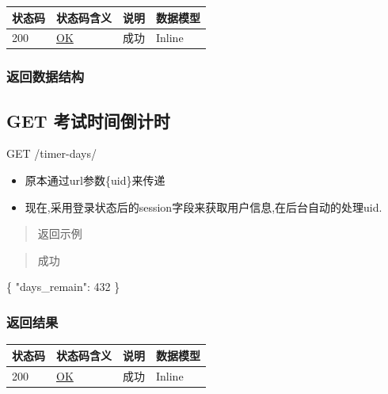 \documentclass[
]{article}
\newenvironment{Shaded}{}{}
\newcommand{\DataTypeTok}[1]{\textcolor[rgb]{0.56,0.13,0.00}{#1}}
\newcommand{\DecValTok}[1]{\textcolor[rgb]{0.25,0.63,0.44}{#1}}
\newcommand{\FunctionTok}[1]{\textcolor[rgb]{0.02,0.16,0.49}{#1}}
\begin{document}
\begin{longtable}[]{@{}llll@{}}
\toprule
状态码 & 状态码含义 & 说明 & 数据模型 \\
\midrule
\endhead
200 & \href{https://tools.ietf.org/html/rfc7231\#section-6.3.1}{OK} &
成功 & Inline \\
\bottomrule
\end{longtable}

\hypertarget{ux8fd4ux56deux6570ux636eux7ed3ux6784-33}{%
\subsubsection{返回数据结构}\label{ux8fd4ux56deux6570ux636eux7ed3ux6784-33}}

\hypertarget{get-ux8003ux8bd5ux65f6ux95f4ux5012ux8ba1ux65f6}{%
\subsection{GET
考试时间倒计时}\label{get-ux8003ux8bd5ux65f6ux95f4ux5012ux8ba1ux65f6}}

GET /timer-days/

\begin{itemize}
\item
  原本通过url参数\{uid\}来传递
\item
  现在,采用登录状态后的session字段来获取用户信息,在后台自动的处理uid.
\end{itemize}

\begin{quote}
返回示例
\end{quote}

\begin{quote}
成功
\end{quote}

\begin{Shaded}
\begin{Highlighting}[]
\FunctionTok{\{}
  \DataTypeTok{"days\_remain"}\FunctionTok{:} \DecValTok{432}
\FunctionTok{\}}
\end{Highlighting}
\end{Shaded}

\hypertarget{ux8fd4ux56deux7ed3ux679c-42}{%
\subsubsection{返回结果}\label{ux8fd4ux56deux7ed3ux679c-42}}

\begin{longtable}[]{@{}llll@{}}
\toprule
状态码 & 状态码含义 & 说明 & 数据模型 \\
\midrule
\endhead
200 & \href{https://tools.ietf.org/html/rfc7231\#section-6.3.1}{OK} &
成功 & Inline \\
\bottomrule
\end{longtable}
\end{document}
